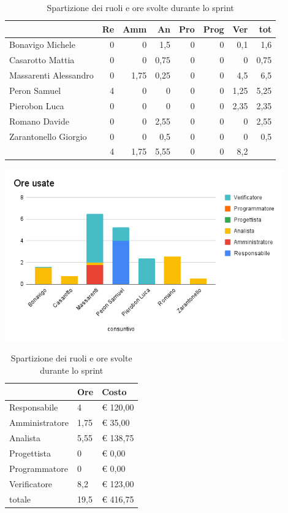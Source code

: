 \begin{table}[h]
    \begin{tabularx}{\linewidth}{X|rrrrrrr}
    \rowcolor{gray!30}& Re & Amm & An & Pro & Prog & Ver & tot \\
    \hline
    Bonavigo Michele      & 0 & 0    & 1,5  & 0 & 0 & 0,1  & 1,6 \\
    \rowcolor{gray!10}Casarotto Mattia      & 0 & 0    & 0,75 & 0 & 0 & 0    & 0,75\\
    Massarenti Alessandro & 0 & 1,75 & 0,25 & 0 & 0 & 4,5  & 6,5 \\
    \rowcolor{gray!10}Peron Samuel          & 4 & 0    & 0    & 0 & 0 & 1,25 & 5,25\\
    Pierobon Luca         & 0 & 0    & 0    & 0 & 0 & 2,35 & 2,35\\
    \rowcolor{gray!10}Romano Davide         & 0 & 0    & 2,55 & 0 & 0 & 0    & 2,55\\
    Zarantonello Giorgio  & 0 & 0    & 0,5  & 0 & 0 & 0    & 0,5 \\
    \hline
                          & 4 & 1,75 & 5,55 & 0 & 0 & 8,2  & 
    \end{tabularx}
    \caption{\label{ruoli-persone}Spartizione dei ruoli e ore svolte durante lo sprint}
\end{table}

\begin{center}
\includegraphics[width=12cm]{img/ore-usate.png}
\end{center}

\begin{table}[h]
    \begin{tabularx}{\linewidth}{X|l|l}
    \rowcolor{gray!30}& Ore & Costo \\
    \hline
    
    Responsabile & 4 & € 120,00 \\
    \rowcolor{gray!10}Amministratore & 1,75 & € 35,00 \\
    Analista & 5,55 & € 138,75 \\
    \rowcolor{gray!10}Progettista & 0 & € 0,00 \\
    Programmatore & 0 & € 0,00 \\
    \rowcolor{gray!10}Verificatore & 8,2 &€ 123,00 \\
    totale & 19,5 & € 416,75 \\
    \end{tabularx}
    \caption{\label{costi-ruolo}Spartizione dei ruoli e ore svolte durante lo sprint}
\end{table}


